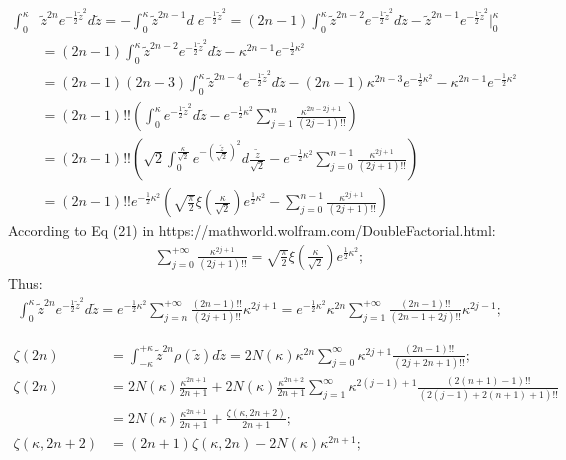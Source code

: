 \documentclass[twoside]{article}
\numberwithin{equation}{section}
\begin{document}
\begin{align*}
\int_{0}^{\kappa}& \tilde{z}^{2n} e^{-\frac{1}{2} \tilde{z}^2} d \tilde{z}
		= - \int_{0}^{\kappa} \tilde{z}^{2n - 1} d\; e^{-\frac{1}{2} \tilde{z}^2}
		= (2n - 1) \int_{0}^{\kappa} \tilde{z}^{2n - 2}  e^{-\frac{1}{2} \tilde{z}^2} d \tilde{z} - \tilde{z}^{2n - 1} e^{-\frac{1}{2} \tilde{z}^2} \Big |_{0}^{\kappa} \\
		&= (2n - 1) \int_{0}^{\kappa} \tilde{z}^{2n - 2}  e^{-\frac{1}{2} \tilde{z}^2} d \tilde{z} - \kappa^{2n - 1} e^{-\frac{1}{2} \kappa^2} \\
		&= (2n - 1) (2n - 3) \int_{0}^{\kappa} \tilde{z}^{2n - 4}  e^{-\frac{1}{2} \tilde{z}^2} d \tilde{z} 
			- (2n - 1) \kappa^{2n - 3} e^{-\frac{1}{2} \kappa^2} - \kappa^{2n - 1} e^{-\frac{1}{2} \kappa^2} \\
		&= (2n - 1)!! \left( \int_{0}^{\kappa} e^{-\frac{1}{2} \tilde{z}^2} d \tilde{z} - e^{-\frac{1}{2} \kappa^2} \sum_{j=1}^{n} \frac{\kappa^{2n - 2j + 1}}{(2j - 1)!!}  \right) \\
		&= (2n - 1)!! \left(\sqrt{2} \int_{0}^{\frac{\kappa}{\sqrt{2}}} e^{-(\frac{\tilde{z}}{\sqrt{2}})^2} d \frac{\tilde{z}}{\sqrt{2}} 
			- e^{-\frac{1}{2} \kappa^2} \sum_{j=0}^{n - 1} \frac{\kappa^{2j + 1}}{(2j + 1)!!} \right) \\
		& = (2n - 1)!! e^{-\frac{1}{2} \kappa^2} \left( \sqrt{\frac{\pi}{2}} \xi (\frac{\kappa}{\sqrt{2}})  e^{\frac{1}{2} \kappa^2} 
			- \sum_{j=0}^{n - 1} \frac{\kappa^{2j + 1}}{(2j + 1)!!}  \right)
\end{align*}
According to Eq (21) in https://mathworld.wolfram.com/DoubleFactorial.html:
\begin{align*}
\sum_{j=0}^{+\infty} \frac{\kappa^{2j + 1}}{(2j + 1)!!} = \sqrt{\frac{\pi}{2}} \xi (\frac{\kappa}{\sqrt{2}}) e^{\frac{1}{2} \kappa^2};
\end{align*}
Thus:
\begin{align*}
\int_{0}^{\kappa} \tilde{z}^{2n} e^{-\frac{1}{2} \tilde{z}^2} d \tilde{z}
		=  e^{-\frac{1}{2} \kappa^2} \sum_{j=n}^{+\infty} \frac{(2n - 1)!!}{(2j + 1)!!} \kappa^{2j + 1}
		= e^{-\frac{1}{2} \kappa^2} \kappa^{2n} \sum_{j=1}^{+\infty} \frac{(2n - 1)!!}{(2n - 1 + 2j)!!} \kappa^{2j - 1};
\end{align*}


\begin{align*}
\zeta(2n) &= \int_{-\kappa}^{+\kappa} \tilde{z}^{2n} \rho(\tilde{z}) d \tilde{z} = 2 N(\kappa) \kappa^{2n} \sum_{j=0}^{\infty} \kappa^{2j+1} \frac{(2n-1)!!}{(2j + 2n+1)!!}; \\
\zeta(2n) &= 2 N(\kappa) \frac{\kappa^{2n+1}}{2n + 1} + 2 N(\kappa) \frac{\kappa^{2n+2}}{2n+1} \sum_{j=1}^{\infty} \kappa^{2(j-1)+1} \frac{(2(n+1)- 1)!!}{(2(j-1)+2(n+1)+1)!!} \\
 &= 2 N(\kappa) \frac{\kappa^{2n + 1}}{2n + 1} + \frac{\zeta(\kappa, 2n + 2)}{2n + 1}; \\
\zeta(\kappa, 2n + 2) &= (2n + 1) \zeta(\kappa, 2n) - 2 N(\kappa) \kappa^{2n + 1};
\end{align*}
\end{document}
